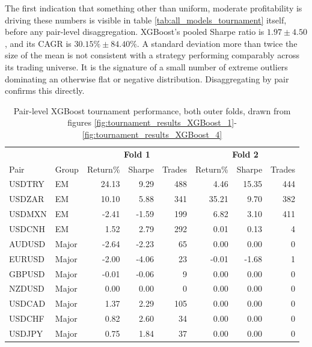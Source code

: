 \documentclass[12pt, a4paper]{article}
\begin{document}
\medskip




The first indication that something other than uniform, moderate profitability is driving these numbers is visible in table \ref{tab:all_models_tournament} itself, before any 
pair-level disaggregation. XGBoost's pooled Sharpe ratio is $1.97 \pm 4.50$, and its CAGR is $30.15\% \pm 84.40\%$. A standard deviation more than twice the size of the mean is 
not consistent with a strategy performing comparably across its trading universe. It is the signature of a small number of extreme outliers dominating an otherwise flat or 
negative distribution. Disaggregating by pair confirms this directly.

\begin{table}[H]
\centering
\small
\begin{tabular}{ll|rrr|rrr}
\toprule
 & & \multicolumn{3}{c|}{\textbf{Fold 1}} & \multicolumn{3}{c}{\textbf{Fold 2}} \\
Pair & Group & Return\% & Sharpe & Trades & Return\% & Sharpe & Trades \\
\midrule
USDTRY & EM     & 24.13 & 9.29  & 488 & 4.46  & 15.35 & 444 \\
USDZAR & EM     & 10.10 & 5.88  & 341 & 35.21 & 9.70  & 382 \\
USDMXN & EM     & -2.41 & -1.59 & 199 & 6.82  & 3.10  & 411 \\
USDCNH & EM     & 1.52  & 2.79  & 292 & 0.01  & 0.13  & 4   \\
\midrule
AUDUSD & Major  & -2.64 & -2.23 & 65  & 0.00  & 0.00  & 0   \\
EURUSD & Major  & -2.00 & -4.06 & 23  & -0.01 & -1.68 & 1   \\
GBPUSD & Major  & -0.01 & -0.06 & 9   & 0.00  & 0.00  & 0   \\
NZDUSD & Major  & 0.00  & 0.00  & 0   & 0.00  & 0.00  & 0   \\
USDCAD & Major  & 1.37  & 2.29  & 105 & 0.00  & 0.00  & 0   \\
USDCHF & Major  & 0.82  & 2.60  & 34  & 0.00  & 0.00  & 0   \\
USDJPY & Major  & 0.75  & 1.84  & 37  & 0.00  & 0.00  & 0   \\
\bottomrule
\end{tabular}
\caption{Pair-level XGBoost tournament performance, both outer folds, drawn from figures \ref{fig:tournament_results_XGBoost_1}-\ref{fig:tournament_results_XGBoost_4}}
\label{tab:pair_level_xgb}
\end{table}
\end{document}
